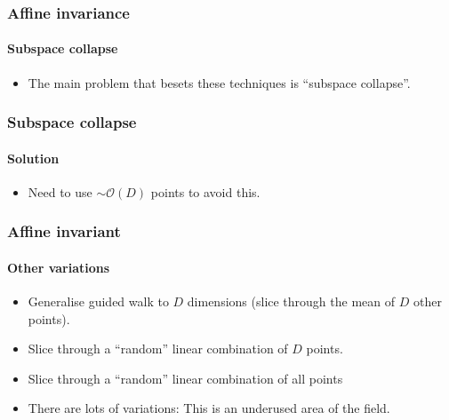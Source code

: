 \documentclass[]{beamer}
\begin{document}

\begin{frame}
  \frametitle{Affine invariance}
  \framesubtitle{Subspace collapse}
  \begin{itemize}
    \pause\item The main problem that besets these techniques is ``subspace collapse''.
  \end{itemize}
\end{frame}



\begin{frame}
  \frametitle{Subspace collapse}
  \framesubtitle{Solution}
  \begin{itemize}
    \pause\item Need to use $\sim\mathcal{O}(D)$ points to avoid this.
  \end{itemize}
\end{frame}


\begin{frame}
  \frametitle{Affine invariant}
  \framesubtitle{Other variations}
  \begin{itemize}
    \pause\item Generalise guided walk to $D$ dimensions (slice through the mean of $D$ other points).
    \pause\item Slice through a ``random'' linear combination of $D$ points.
    \pause\item Slice through a ``random'' linear combination of all points
    \pause\item There are lots of variations: This is an underused area of the field.
  \end{itemize}
\end{frame}
\end{document}
